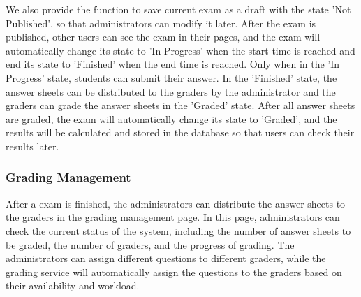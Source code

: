 \documentclass[12pt]{article}
\begin{document}
  



We also provide the function to save
current exam as a draft with the state 'Not Published', so that administrators can modify it later.
After the exam is published, other users can see the exam in their pages, and the exam will automatically change its state to 'In Progress' when the start time is reached and
end its state to 'Finished' when the end time is reached. Only when in the 'In Progress' state, students can submit their answer.
In the 'Finished' state, the answer sheets can be distributed to the graders by the administrator and the graders can grade the answer sheets in the 'Graded' state.
After all answer sheets are graded, the exam will automatically change its state to 'Graded', and the results will be calculated and stored in the database
so that users can check their results later.
\subsubsection{Grading Management}
After a exam is finished, the administrators can distribute the answer sheets to the graders in the grading management page.
In this page, administrators can check the current status of the system, including the number of answer sheets to be graded, the number of graders,
and the progress of grading. The administrators can assign different questions to different graders, while the grading service
will automatically assign the questions to the graders based on their availability and workload.
\end{document}
